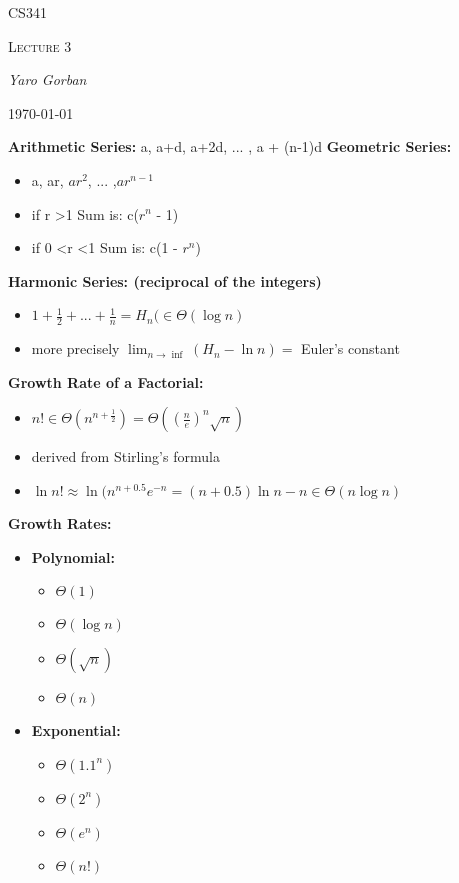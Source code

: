 \documentclass[12pt,a4paper]{report}
\begin{document}
	\centering
	{\scshape\LARGE CS341 \par}
	{\scshape\Large Lecture 3\par}
	{\Large\itshape Yaro Gorban\par}
	{\large \today\par}
	\vspace{1.5cm}
	
	\textbf{Arithmetic Series:}
	a, a+d, a+2d, ... , a + (n-1)d \linebreak
	\textbf{Geometric Series:}
	\begin{itemize}
	\item a, ar, $ar^2$, ... ,$ar^{n-1}$
	\item if r \textgreater 1 Sum is: c($r^n$ - 1)
	\item if 0 \textless r \textless 1 Sum is: c(1 - $r^n$)
	\end{itemize}
	\textbf{Harmonic Series: (reciprocal of the integers)}
	\begin{itemize}
	\item $1 + \frac{1}{2} + ... + \frac{1}{n} = H_{n}(\in \Theta(\log{n})$
	\item more precisely $\lim_{n \to \inf}(H_n - \ln{n}) =$ Euler's constant
	\end{itemize}
	\textbf{Growth Rate of a Factorial:}
	\begin{itemize}
	\item $n! \in \Theta(n^{n+ \frac{1}{2}}) = \Theta((\frac{n}{e})^n\sqrt{n})$
	\item derived from Stirling's formula
	\item $\ln n! \approx \ln(n^{n + 0.5}e^{-n} = (n + 0.5)\ln n - n\in\Theta(n\log n)$
	\end{itemize}
	\textbf{Growth Rates:}
	\begin{itemize}
	\item \textbf{Polynomial:}
	\begin{itemize}
	\item $\Theta(1)$
	\item $\Theta(\log n)$
	\item $\Theta(\sqrt{n})$
	\item $\Theta(n)$	
	\end{itemize}
	\item \textbf{Exponential:}
	\begin{itemize}
	\item $\Theta(1.1^n)$
	\item $\Theta(2^n)$
	\item $\Theta(e^n)$
	\item $\Theta(n!)$
	\end{itemize}
	\end{itemize}
\end{document}
